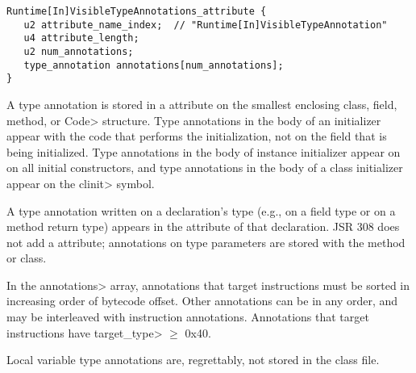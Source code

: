 \documentclass[10pt]{article}
\newcommand{\preverbnegspace}{\vspace{-5pt}}
\begin{document}
\preverbnegspace
\begin{Verbatim}
Runtime[In]VisibleTypeAnnotations_attribute {
   u2 attribute_name_index;  // "Runtime[In]VisibleTypeAnnotation"
   u4 attribute_length;
   u2 num_annotations;
   type_annotation annotations[num_annotations];
}
\end{Verbatim}


A type annotation is stored in a \RuntimeInOrVisibleTypeAnnotations attribute
on the smallest enclosing class, field, method, or \<Code> structure.
Type annotations in the body of an initializer appear with the code that
performs the initialization, not on the field that is being initialized.
Type annotations in the body of instance initializer appear on on all
initial constructors, and type annotations in the body of a class
initializer appear on the \<clinit> symbol.


A type annotation written on a declaration's type (e.g., on a field type or
on a method return type)
appears in the \RuntimeInOrVisibleTypeAnnotations attribute of that declaration.
JSR 308 does not add a \RuntimeInOrVisibleTypeParameterAnnotations
attribute; annotations on type parameters are stored with the method or class.



In the \<annotations> array, annotations that target instructions must be
sorted in increasing order of bytecode offset.  Other annotations can be in
any order, and may be interleaved with instruction annotations.
Annotations that target instructions 
have
\<target\_type> $\ge$ 0x40.

Local variable type annotations are, regrettably, not stored in the class file.
\end{document}
